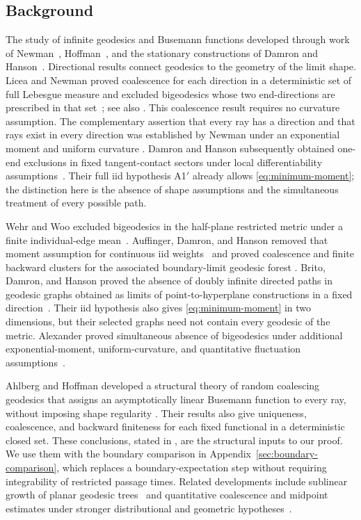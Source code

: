 \subsection*{Background}
The study of infinite geodesics and Busemann functions developed through
work of Newman~\cite{Newman1995}, Hoffman~\cite{Hoffman2005,Hoffman2008},
and the stationary constructions of Damron and
Hanson~\cite{DamronHanson2014}. Directional results connect geodesics
to the geometry of the limit shape. Licea and Newman proved coalescence
for each direction in a deterministic set of full Lebesgue measure and
excluded bigeodesics whose two end-directions are prescribed in that
set~\cite{LiceaNewman}; see also
\cite[Theorem~3.1 and Remark~2 after Theorem~1]{DamronHanson}.
This coalescence result requires no curvature assumption.
The complementary assertion that every ray has a direction and that
rays exist in every direction was established by Newman under an
exponential moment and uniform curvature
\cite[Theorem~2.1]{Newman1995}. Damron and Hanson subsequently obtained
one-end exclusions in fixed tangent-contact sectors under local
differentiability assumptions~\cite[Theorem~1]{DamronHanson}.
Their full iid hypothesis A1$'$ already allows
\eqref{eq:minimum-moment}; the distinction here is the absence of shape
assumptions and the simultaneous treatment of every possible path.

Wehr and Woo excluded bigeodesics in the half-plane restricted metric
under a finite individual-edge mean~\cite{WehrWoo1998}.
Auffinger, Damron, and Hanson removed that moment assumption for
continuous iid weights~\cite[Appendix~C]{AuffingerDamronHanson2015}
and proved coalescence and finite backward clusters for the associated
boundary-limit geodesic forest
\cite[Theorem~1.5]{AuffingerDamronHanson2015}.
Brito, Damron, and Hanson proved the absence of doubly infinite directed
paths in geodesic graphs obtained as limits of point-to-hyperplane
constructions in a fixed direction~\cite{BritoDamronHanson2023}.
Their iid hypothesis also gives \eqref{eq:minimum-moment} in two
dimensions, but their selected graphs need not contain every geodesic
of the metric. Alexander proved simultaneous absence of bigeodesics
under additional exponential-moment, uniform-curvature, and quantitative
fluctuation assumptions~\cite{Alexander2023}.

Ahlberg and Hoffman developed a structural theory of random
coalescing geodesics that assigns an asymptotically linear Busemann
function to every ray, without imposing shape regularity
\cite{AhlbergHoffman}.
Their results also give uniqueness, coalescence, and backward
finiteness for each fixed functional in a deterministic closed set.
These conclusions, stated in , are the structural
inputs to our proof. We use them with the boundary comparison in
Appendix~\ref{sec:boundary-comparison}, which replaces a boundary-expectation
step without requiring integrability of restricted passage times.
Related developments include sublinear growth of planar geodesic
trees~\cite{AhlbergHansonHoffman} and quantitative coalescence and
midpoint estimates under stronger distributional and geometric
hypotheses~\cite{DembinElboimPeled}.


